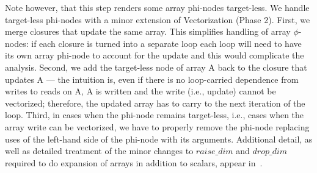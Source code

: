 \begin{comment}
Consider the earlier example. There is a single loop, $i$. Clearly, there is no pair $\underline{i}$ and $\underline{i}'$, where $\underline{i} < \underline{i}'$ that make $\underline{i} = \underline{i}'$
due to the def-use pairs of {\sf A} 6-7 and 6-8.
Therefore, we remove the back edge from 6 to the phi-node 2. Analogously, we remove the back edges from 7 to 3 and from 8 to 4. However, there are many values $\underline{i} < \underline{i'}$ that make $\underline{i} = \underline{i'}-1$ and the back edge from 9 to 5 remains (def-use pairs for {\sf D}). As a result of removing these spurious edges, Vectorization will find that statement 6 is vectorizable. Statements 7, 8 and 9 will correctly appear in the FOR loop.
\end{comment}

Note however, that this step renders some array phi-nodes target-less. We handle target-less phi-nodes with a minor extension of Vectorization (Phase 2).
First, we merge closures that update the same array. This simplifies handling of array $\phi$-nodes: if each closure is turned into a separate loop
each loop will need to have its own array phi-node to account for the update and this would complicate the analysis.
Second, we add the target-less node of array {\sf A} back to the closure that updates {\sf A} ---
the intuition is, even if there is no loop-carried dependence from writes to reads on {\sf A}, {\sf A} is written and the write (i.e., update) cannot be vectorized;
therefore, the updated array has to carry to the next iteration of the loop. Third, in cases when the phi-node remains target-less, i.e., cases when the
array write can be vectorized, we have to properly remove the phi-node replacing uses of the left-hand side of the phi-node with its arguments.
Additional detail, as well as detailed treatment of the minor changes to $\mathit{raise\_dim}$ and $\mathit{drop\_dim}$ required to do expansion of arrays 
in addition to scalars, appear in~\cite{Anon_TR}.



